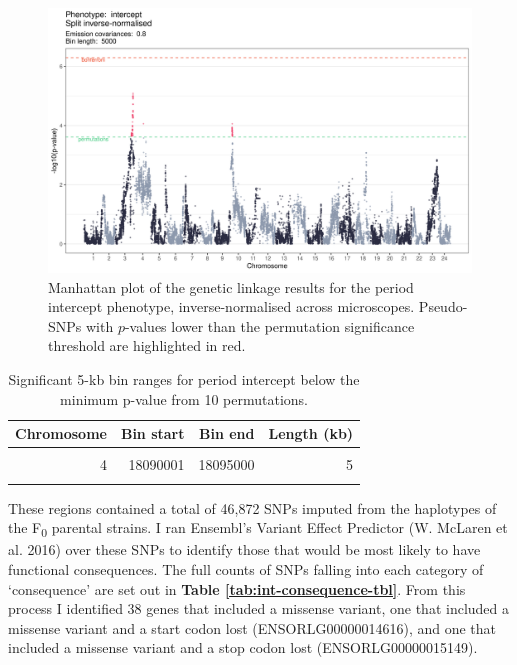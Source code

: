 \documentclass[
]{book}
\begin{document}
\begin{figure}
\includegraphics[width=1\linewidth]{figs/somites/manhattan_intercept} \caption{Manhattan plot of the genetic linkage results for the period intercept phenotype, inverse-normalised across microscopes. Pseudo-SNPs with \(p\)-values lower than the permutation significance threshold are highlighted in red.}\label{fig:somite-manhattan}
\end{figure}

\begin{table}

\caption{\label{tab:somite-sig-int-tbl}Significant 5-kb bin ranges for period intercept below the minimum p-value from 10 permutations.}
\centering
\begin{tabular}[t]{rrrr}
\toprule
Chromosome & Bin start & Bin end & Length (kb)\\
\midrule
\cellcolor{gray!6}{3} & \cellcolor{gray!6}{31880001} & \cellcolor{gray!6}{35420000} & \cellcolor{gray!6}{3540}\\
4 & 18090001 & 18095000 & 5\\
\cellcolor{gray!6}{10} & \cellcolor{gray!6}{2995001} & \cellcolor{gray!6}{3690000} & \cellcolor{gray!6}{695}\\
\bottomrule
\end{tabular}
\end{table}

These regions contained a total of 46,872 SNPs imputed from the haplotypes of the F\textsubscript{0} parental strains. I ran Ensembl's Variant Effect Predictor (W. McLaren et al. 2016) over these SNPs to identify those that would be most likely to have functional consequences. The full counts of SNPs falling into each category of `consequence' are set out in \textbf{Table \ref{tab:int-consequence-tbl}}. From this process I identified 38 genes that included a missense variant, one that included a missense variant and a start codon lost (ENSORLG00000014616), and one that included a missense variant and a stop codon lost (ENSORLG00000015149).
\end{document}
